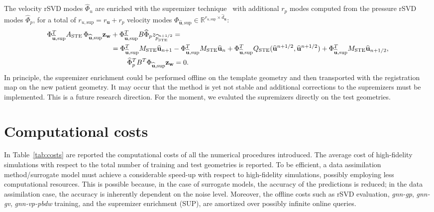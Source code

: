 The velocity rSVD modes $\widehat{\Phi}_{u}$ are enriched with the supremizer technique~\cite{ballarin2015supremizer} with additional $r_p$ modes computed from the pressure rSVD modes $\widehat{\Phi}_{p}$, for a total of $r_{u,\text{sup}}=r_{\mathbf u}+r_p$ velocity modes $\Phi_{\widehat{\mathbf{u}},\text{sup}}\in\mathbb{R}^{r_{u,\text{sup}}\times \widehat{d}_{\mathbf u}}$:
\begin{align*}
  \Phi_{\widehat{\mathbf{u}},\text{sup}}^T A_{\text{STE}}\,\Phi_{\widehat{\mathbf{u}},\text{sup}}\mathbf{z}_{\mathbf{w}} &+ \Phi_{\widehat{\mathbf{u}},\text{sup}}^T B \widehat{\Phi}_{p}z_{\widehat{p}^{n+1/2}_{\text{STE}}} = \\
  &=\Phi_{\widehat{\mathbf{u}},\text{sup}}^T M_{\text{STE}}\widehat{\mathbf{u}}_{n+1} - \Phi_{\widehat{\mathbf{u}},\text{sup}}^T M_{\text{STE}}\widehat{\mathbf{u}}_{n} + \Phi_{\widehat{\mathbf{u}},\text{sup}}^T Q_{\text{STE}}(\widehat{\mathbf{u}}^{n+1/2}, \widehat{\mathbf{u}}^{n+1/2}) + \Phi_{\widehat{\mathbf{u}},\text{sup}}^T M_{\text{STE}}\widehat{\mathbf{u}}_{n+1/2},\\
    &\qquad\,\,\widehat{\Phi}_{p}^T B^T\Phi_{\widehat{\mathbf{u}},\text{sup}}\mathbf{z}_{\mathbf{w}} = 0.
\end{align*}
In principle, the supremizer enrichment could be performed offline on the template geometry and then transported with the registration map on the new patient geometry. It may occur that the method is yet not stable and additional corrections to the supremizers must be implemented. This is a future research direction. For the moment, we evaluted the supremizers directly on the test geometries.

\section{Computational costs}
\label{appendix:costs}

In Table~\ref{tab:costs} are reported the computational costs of all the numerical procedures introduced. The average cost of high-fidelity simulations with respect to the total number of training and test geometries is reported. To be efficient, a data assimilation method/surrogate model must achieve a considerable speed-up with respect to high-fidelity simulations, possibly employing less computational resources. This is possible because, in the case of surrogate models, the accuracy of the predictions is reduced; in the data assimilation case, the accuracy is inherently dependent on the noise level. Moreover, the offline costs such as rSVD evaluation, \textit{gnn-gp}, \textit{gnn-gv}, \textit{gnn-vp-pbdw} training, and the supremizer enrichment (SUP), are amortized over possibly infinite online queries.

